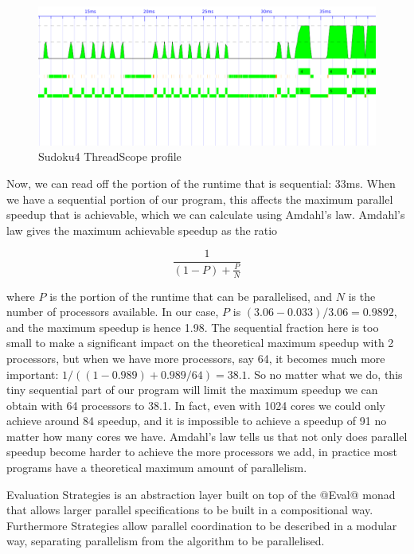 \begin{figure}
\begin{center}
\includegraphics[scale=0.4]{sudoku4.png}
\end{center}
\caption{Sudoku4 ThreadScope profile}
\label{fig:sudoku4-threadscope}
\end{figure}

Now, we can read off the portion of the runtime that is sequential:
33ms.  When we have a sequential portion of our program, this affects
the maximum parallel speedup that is achievable, which we can
calculate using Amdahl's law.  Amdahl's law gives the maximum
achievable speedup as the ratio

\[
  \frac{1}{(1 - P) + \frac{P}{N}}
\]

\noindent where $P$ is the portion of the runtime that can be
parallelised, and $N$ is the number of processors available.  In our
case, $P$ is $(3.06-0.033)/3.06 = 0.9892$, and the maximum speedup is
hence 1.98.  The sequential fraction here is too small to make a
significant impact on the theoretical maximum speedup with 2
processors, but when we have more processors, say 64, it becomes much
more important: $1 / ((1-0.989) + 0.989/64) = 38.1$.  So no matter
what we do, this tiny sequential part of our program will limit the
maximum speedup we can obtain with 64 processors to 38.1.  In fact,
even with 1024 cores we could only achieve around 84 speedup, and it
is impossible to achieve a speedup of 91 no matter how many cores we
have.  Amdahl's law tells us that not only does parallel speedup
become harder to achieve the more processors we add, in practice most
programs have a theoretical maximum amount of parallelism.



Evaluation Strategies \cite{trinder:strategies,seq-no-more} is an abstraction
layer built on top of the @Eval@ monad that allows larger parallel
specifications to be built in a compositional way.  Furthermore
Strategies allow parallel coordination to be described in a modular
way, separating parallelism from the algorithm to be parallelised.


